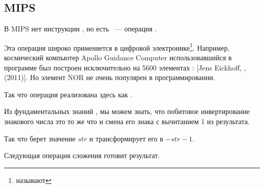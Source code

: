 ﻿\subsection{MIPS}



В MIPS нет инструкции \NOT, но есть \NOR~--- операция .

Эта операция широко применяется в цифровой электронике\footnote{\NOR называют }.
Например, космический компьютер Apollo Guidance Computer использовавшийся в программе  был
построен исключительно на 5600 элементах \NOR: 
[Jens Eickhoff, , (2011)].
Но элемент NOR не очень популярен в программировании.

Так что операция \NOT реализована здесь как .

Из фундаментальных знаний , мы можем знать, что побитовое инвертирование знакового
числа это то же что и смена его знака с вычитанием 1 из результата.

Так что \NOT берет значение $str$ и трансформирует его в $-str-1$.

Следующая операция сложения готовит результат.

